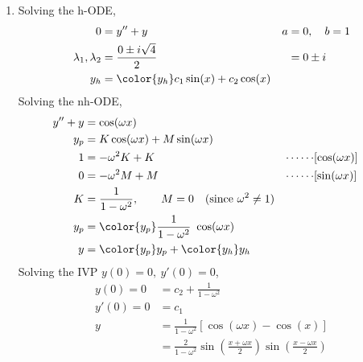 \begin{enumerate}
    \item Solving the h-ODE,
          \begin{align}
              0                        & = y'' + y                                 &
              a                        & = 0, \quad b = 1                            \\
              \lambda_{1}, \lambda_{2} & = \frac{0 \pm i\sqrt{4}}{2}               &
                                       & = 0 \pm i                                   \\
              y_{h}                    & = \color{y_h} c_{1}\sin(x) + c_{2}\cos(x)
          \end{align}
          Solving the nh-ODE,
          \begin{align}
              y'' + y      & = \cos(\omega x)                                         \\
              y_{p}        & = K \cos(\omega x) + M \sin(\omega x)                    \\
              1            & = -\omega^{2}K + K                                     &
              \cdots\cdots & [\cos(\omega x)]                                         \\
              0            & = -\omega^{2}M + M                                     &
              \cdots\cdots & [\sin(\omega x)]                                         \\
              K            & = \frac{1}{1 - \omega^{2}}, \qquad M = 0 \quad
              (\text{since}\ \omega^{2} \neq 1)                                       \\
              y_{p}        & = \color{y_p} \frac{1}{1 - \omega^{2}}\ \cos(\omega x)   \\
              y            & = {\color{y_p} y_{p}} + {\color{y_h} y_{h}}
          \end{align}
          Solving the IVP $ y(0) = 0,\ y'(0) = 0 $,
          \begin{align}
              y(0) = 0  & = c_{2} + \frac{1}{1 - \omega^{2}}                          \\
              y'(0) = 0 & = c_{1}                                                     \\
              y         & = \frac{1}{1 - \omega^{2}} [\cos(\omega x) - \cos(x)]       \\
                        & = \frac{2}{1 - \omega^{2}}\sin\left( \frac{x + \omega x}{2}
              \right)
              \sin\left( \frac{x - \omega x}{2} \right)

\end{align}
\end{enumerate}
